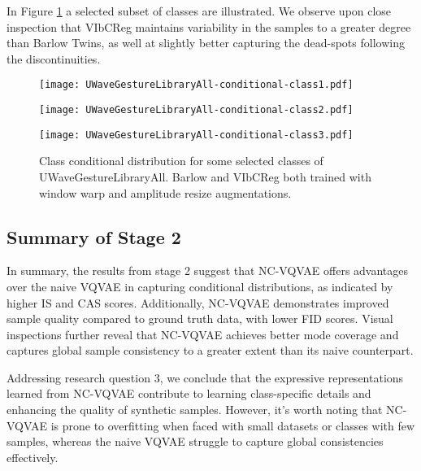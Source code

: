 \documentclass[../../thesis.tex]{subfiles}
\begin{document}
In Figure \ref{fig:Warp_Uwave} a selected subset of classes are illustrated. We observe upon close inspection that VIbCReg maintains variability in the samples to a greater degree than Barlow Twins, as well at slightly better capturing the dead-spots following the discontinuities.


\begin{figure}[h]
    \centering
    \begin{minipage}[b]{0.32\textwidth}
        \centering
        \texttt{[image: UWaveGestureLibraryAll-conditional-class1.pdf]}
    \end{minipage}
    \begin{minipage}[b]{0.32\textwidth}
        \centering
        \texttt{[image: UWaveGestureLibraryAll-conditional-class2.pdf]}
    \end{minipage}
    \begin{minipage}[b]{0.32\textwidth}
        \centering
        \texttt{[image: UWaveGestureLibraryAll-conditional-class3.pdf]}
    \end{minipage}
    \caption{Class conditional distribution for some selected classes of UWaveGestureLibraryAll. Barlow and VIbCReg both trained with window warp and amplitude resize augmentations.}
    \label{fig:Warp_Uwave}
\end{figure}



\subsection*{Summary of Stage 2}

In summary, the results from stage 2 suggest that NC-VQVAE offers advantages over the naive VQVAE in capturing conditional distributions, as indicated by higher IS and CAS scores. Additionally, NC-VQVAE demonstrates improved sample quality compared to ground truth data, with lower FID scores. Visual inspections further reveal that NC-VQVAE achieves better mode coverage and captures global sample consistency to a greater extent than its naive counterpart.\newline

Addressing research question 3, we conclude that the expressive representations learned from NC-VQVAE contribute to learning class-specific details and enhancing the quality of synthetic samples. However, it's worth noting that NC-VQVAE is prone to overfitting when faced with small datasets or classes with few samples, whereas the naive VQVAE struggle to capture global consistencies effectively.\newline
\end{document}
